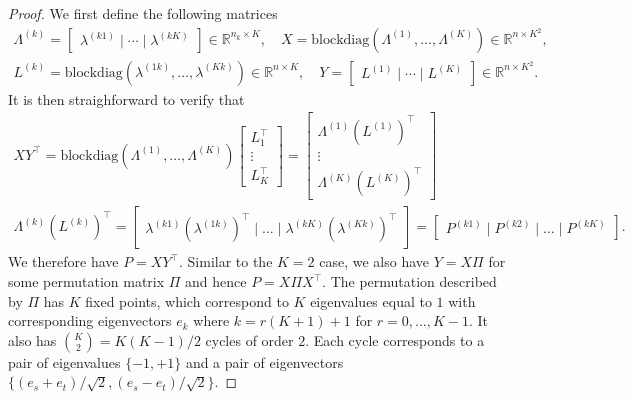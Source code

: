 \documentclass[12pt]{article}
\begin{document}
\begin{proof}
We first define the following matrices
\begin{gather}
\label{eq:xy}
\Lambda^{(k)} = \begin{bmatrix} \lambda^{(k1)} \mid \cdots \mid \lambda^{(kK)} \end{bmatrix}
\in \mathbb{R}^{n_k \times K}, \quad
X = \text{blockdiag}(\Lambda^{(1)}, \dots, \Lambda^{(K)}) \in
\mathbb{R}^{n \times K^2}, \\
L^{(k)} = \text{blockdiag}(\lambda^{(1k)}, \dots, \lambda^{(Kk)}) \in
\mathbb{R}^{n \times K}, \quad
Y = \begin{bmatrix} L^{(1)} \mid \cdots \mid L^{(K)} \end{bmatrix} \in
\mathbb{R}^{n \times K^2}.
\end{gather}
It is then straighforward to verify that
\begin{gather*}
  XY^{\top} = \text{blockdiag}(\Lambda^{(1)}, \dots,
\Lambda^{(K)}) \begin{bmatrix} L_1^{\top} \\ \vdots \\
  L_{K}^{\top} \end{bmatrix} = \begin{bmatrix} \Lambda^{(1)}
  (L^{(1)})^{\top} \\ \vdots \\
  \Lambda^{(K)} (L^{(K)})^{\top} \end{bmatrix} \\
\Lambda^{(k)} (L^{(k)})^{\top} = \begin{bmatrix} \lambda^{(k1)}
  (\lambda^{(1k)})^{\top} \mid \dots \mid \lambda^{(kK)}
  (\lambda^{(Kk)})^{\top} \end{bmatrix} = \begin{bmatrix} P^{(k1)}
  \mid P^{(k2)} \mid \dots \mid P^{(kK)} \end{bmatrix}.
\end{gather*}
We therefore have $P = X Y^\top$. Similar to the $K = 2$ case, we also have $Y = X \Pi$ for some permutation matrix
$\Pi$ and hence $P = X \Pi X^\top$.
The permutation described by $\Pi$ has $K$ fixed points, which correspond to
$K$ eigenvalues equal to $1$ with corresponding eigenvectors $e_k$ where
$k = r (K + 1) + 1$ for $r = 0, ..., K - 1$. It also has
$\binom{K}{2} = K (K - 1) / 2$ cycles of order $2$. Each cycle corresponds to
a pair of eigenvalues $\{-1,+1\}$ and a pair of eigenvectors
$\{(e_s + e_t)/\sqrt{2},(e_s - e_t)/ \sqrt{2}\}$.


\end{proof}
\end{document}
